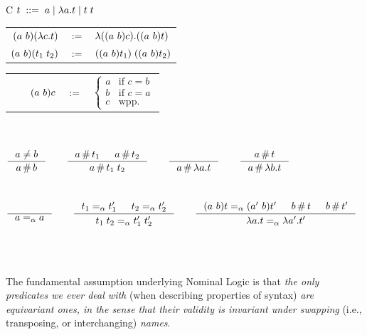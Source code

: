\documentclass[aspectratio=169]{beamer}
\newcommand{\aequiv}{\ensuremath{=_\alpha}}
\begin{document}
\begin{frame}
  \begin{tabularx}{\textwidth}{C}
      $ t \; ::= \; a \mid \lambda a . t \mid t\;t$
    \hspace{10cm} {$ $}\\
    \begin{tabular}{rcl}
      $(a\ b) (\lambda c . t) $ & $:=$
      & $ \lambda ((a\ b) c) . ((a\ b) t)$ \\
      $(a\ b) (t_1\; t_2) $ & $:=$
      & $ ((a\ b) t_1) \; ((a\ b) t_2) $ \\
    \end{tabular}
    \begin{tabular}{rcl}
    $\qquad(a\ b) c$ & $:=$
      & $ \begin{cases}
        a & \text{if } c = b \\
        b & \text{if } c = a \\
        c & \text{wpp.}
      \end{cases}$
      \\
    \end{tabular}
\\ \\ $
      \inference{
        a \cneq b
      }{
        a \cfresh b
      }
      \qquad
      \inference{
        a \cfresh t_1 & a \cfresh t_2
      }{
        a \cfresh t_1\;t_2
      }
      \qquad
      \inference{
      }{
        a \cfresh \lambda a . t
      }
      \qquad
      \inference{
        a \cfresh t
      }{
        a \cfresh \lambda b . t
      }
      $ \\ \\ \\ $
    \inference{
      \text{}
    }{
      a \aequiv a
    }
    \qquad
    \inference{
      t_1 \aequiv t_1' & t_2 \aequiv t_2'
    }{
      t_1\;t_2 \aequiv t_1'\;t_2'
    }
    \qquad
    \inference{
      \permswap{a}{b}{t} \aequiv \permswap{a'}{b}{t'} & b \cfresh t & b \cfresh t'
    }{
      \lambda a . t \aequiv \lambda a' . t'
    }
    $ \\ \\
\end{tabularx}
\\
\begin{mdframed}[frametitle={\textnormal{\scriptsize \textbf{Andrew M. Pitts}, \textit{``Nominal logic, a first order theory of names and binding''}}:}]
{\footnotesize
The fundamental assumption underlying Nominal Logic is that \textit{the only predicates we ever deal with} (when describing properties of syntax) \textit{are equivariant ones, in the sense that their validity is invariant under swapping} (i.e., transposing, or interchanging) \textit{names}.
}
\end{mdframed}
\end{frame}
\end{document}
